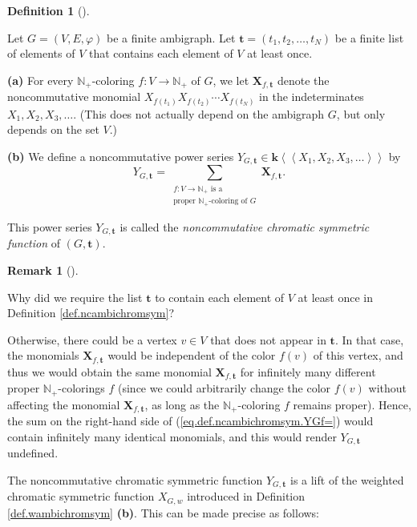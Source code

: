 \documentclass[numbers=enddot,12pt,final,onecolumn,notitlepage]{scrartcl}%
\theoremstyle{definition}
\newtheorem{defi}[theo]{Definition}
\newenvironment{definition}[1][]
{\begin{defi}[#1]\begin{leftbar}}
{\end{leftbar}\end{defi}}
\newtheorem{remk}[theo]{Remark}
\newenvironment{remark}[1][]
{\begin{remk}[#1]\begin{leftbar}}
{\end{leftbar}\end{remk}}
\let\sumnonlimits\sum
\renewcommand{\sum}{\sumnonlimits\limits}
\begin{document}
\begin{definition}
\label{def.ncambichromsym}Let $G=\left(  V,E,\varphi\right)  $ be a finite
ambigraph. Let $\mathbf{t}=\left(  t_{1},t_{2},\ldots,t_{N}\right)  $ be a
finite list of elements of $V$ that contains each element of $V$ at least once.

\textbf{(a)} For every $\mathbb{N}_{+}$-coloring $f:V\rightarrow\mathbb{N}%
_{+}$ of $G$, we let $\mathbf{X}_{f,\mathbf{t}}$ denote the noncommutative
monomial $X_{f\left(  t_{1}\right)  }X_{f\left(  t_{2}\right)  }\cdots
X_{f\left(  t_{N}\right)  }$ in the indeterminates $X_{1},X_{2},X_{3},\ldots$.
(This does not actually depend on the ambigraph $G$, but only depends on the
set $V$.)

\textbf{(b)} We define a noncommutative power series $Y_{G,\mathbf{t}}%
\in\mathbf{k}\left\langle \left\langle X_{1},X_{2},X_{3},\ldots\right\rangle
\right\rangle $ by%
\begin{equation}
Y_{G,\mathbf{t}}=\sum_{\substack{f:V\rightarrow\mathbb{N}_{+}\text{ is
a}\\\text{proper }\mathbb{N}_{+}\text{-coloring of }G}}\mathbf{X}%
_{f,\mathbf{t}}. \label{eq.def.ncambichromsym.YGf=}%
\end{equation}


This power series $Y_{G,\mathbf{t}}$ is called the \emph{noncommutative
chromatic symmetric function} of $\left(  G,\mathbf{t}\right)  $.
\end{definition}

\begin{remark}
Why did we require the list $\mathbf{t}$ to contain each element of $V$ at
least once in Definition \ref{def.ncambichromsym}?

Otherwise, there could be a vertex $v\in V$ that does not appear in
$\mathbf{t}$. In that case, the monomials $\mathbf{X}_{f,\mathbf{t}}$ would be
independent of the color $f\left(  v\right)  $ of this vertex, and thus we
would obtain the same monomial $\mathbf{X}_{f,\mathbf{t}}$ for infinitely many
different proper $\mathbb{N}_{+}$-colorings $f$ (since we could arbitrarily
change the color $f\left(  v\right)  $ without affecting the monomial
$\mathbf{X}_{f,\mathbf{t}}$, as long as the $\mathbb{N}_{+}$-coloring $f$
remains proper). Hence, the sum on the right-hand side of
(\ref{eq.def.ncambichromsym.YGf=}) would contain infinitely many identical
monomials, and this would render $Y_{G,\mathbf{t}}$ undefined.
\end{remark}

The noncommutative chromatic symmetric function $Y_{G,\mathbf{t}}$ is a lift
of the weighted chromatic symmetric function $X_{G,w}$ introduced in
Definition \ref{def.wambichromsym} \textbf{(b)}. This can be made precise as follows:
\end{document}
